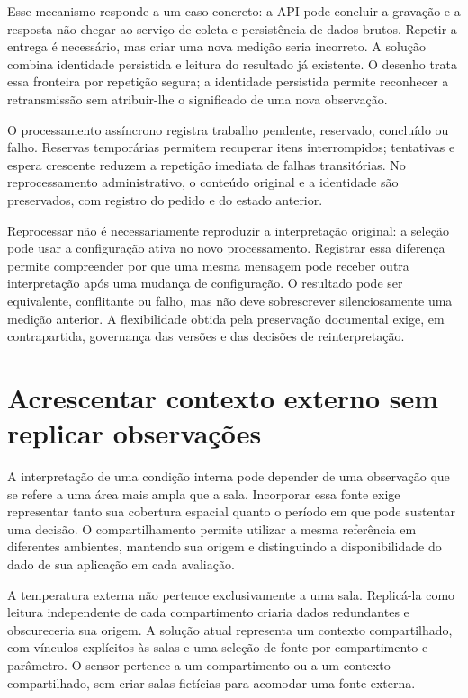 \documentclass[tcc,capa]{texufpel}
\begin{document}
Esse mecanismo responde a um caso concreto: a API pode concluir a gravação e a resposta não chegar ao serviço de coleta e persistência de dados brutos. Repetir a entrega é necessário, mas criar uma nova medição seria incorreto. A solução combina identidade persistida e leitura do resultado já existente. O desenho trata essa fronteira por repetição segura; a identidade persistida permite reconhecer a retransmissão sem atribuir-lhe o significado de uma nova observação.

O processamento assíncrono registra trabalho pendente, reservado, concluído ou falho. Reservas temporárias permitem recuperar itens interrompidos; tentativas e espera crescente reduzem a repetição imediata de falhas transitórias. No reprocessamento administrativo, o conteúdo original e a identidade são preservados, com registro do pedido e do estado anterior.

Reprocessar não é necessariamente reproduzir a interpretação original: a seleção pode usar a configuração ativa no novo processamento. Registrar essa diferença permite compreender por que uma mesma mensagem pode receber outra interpretação após uma mudança de configuração. O resultado pode ser equivalente, conflitante ou falho, mas não deve sobrescrever silenciosamente uma medição anterior. A flexibilidade obtida pela preservação documental exige, em contrapartida, governança das versões e das decisões de reinterpretação.

\section{Acrescentar contexto externo sem replicar observações}
A interpretação de uma condição interna pode depender de uma observação que se refere a uma área mais ampla que a sala. Incorporar essa fonte exige representar tanto sua cobertura espacial quanto o período em que pode sustentar uma decisão. O compartilhamento permite utilizar a mesma referência em diferentes ambientes, mantendo sua origem e distinguindo a disponibilidade do dado de sua aplicação em cada avaliação.

A temperatura externa não pertence exclusivamente a uma sala. Replicá-la como leitura independente de cada compartimento criaria dados redundantes e obscureceria sua origem. A solução atual representa um contexto compartilhado, com vínculos explícitos às salas e uma seleção de fonte por compartimento e parâmetro. O sensor pertence a um compartimento ou a um contexto compartilhado, sem criar salas fictícias para acomodar uma fonte externa.
\end{document}
